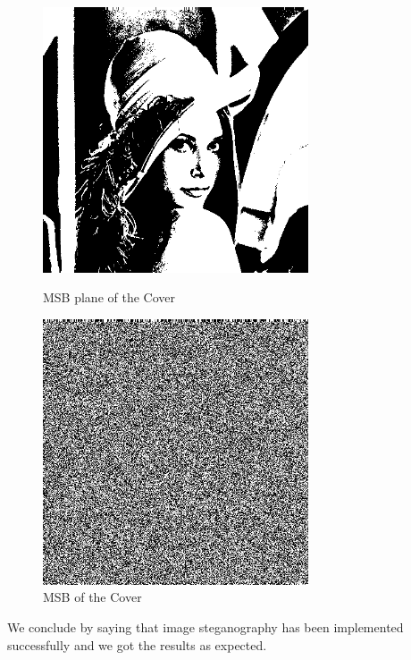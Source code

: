 \documentclass{report}
\begin{document}
\begin{figure}[H]
\centering
\begin{minipage}{0.46\linewidth}
\centering
\includegraphics[width=0.7\textwidth]{images/stegomsb.png}
\caption{MSB plane of the Cover}
\end{minipage}
\hfill
\begin{minipage}{0.46\linewidth}
\centering
\includegraphics[width=0.7\textwidth]{images/stegolsb.png}
\caption{MSB of the Cover}
\end{minipage}
\end{figure}
We conclude by saying that image steganography has been implemented successfully and we got the results as expected.

\begin{center}
\decosix\decosix\decosix
\end{center}
\end{document}
